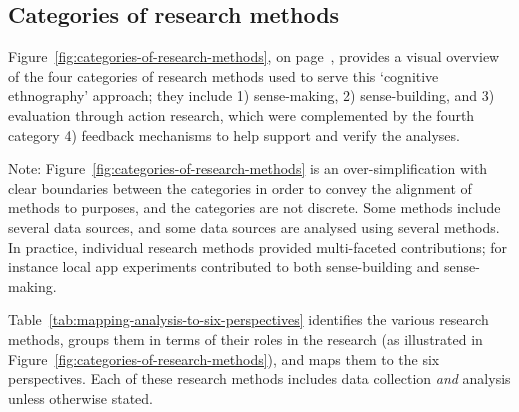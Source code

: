 \subsection{Categories of research methods}
Figure~\ref{fig:categories-of-research-methods}, on page~\pageref{fig:categories-of-research-methods}, provides a visual overview of the four categories of research methods used to serve this `cognitive ethnography' approach; they include 1) sense-making, 2) sense-building, and 3) evaluation through action research, which were complemented by the fourth category 4) feedback mechanisms to help support and verify the analyses. 

Note: Figure~\ref{fig:categories-of-research-methods} is an over-simplification with clear boundaries between the categories in order to convey the alignment of methods to purposes, and the categories are not discrete.  Some methods include several data sources, and some data sources are analysed using several methods. In practice, individual research methods provided multi-faceted contributions; for instance local app experiments contributed to both sense-building and sense-making. 

Table~\ref{tab:mapping-analysis-to-six-perspectives} identifies the various research methods, groups them in terms of their roles in the research (as illustrated in Figure~\ref{fig:categories-of-research-methods}), and maps them to the six perspectives.  Each of these research methods includes data collection \textit{and} analysis unless otherwise stated.


